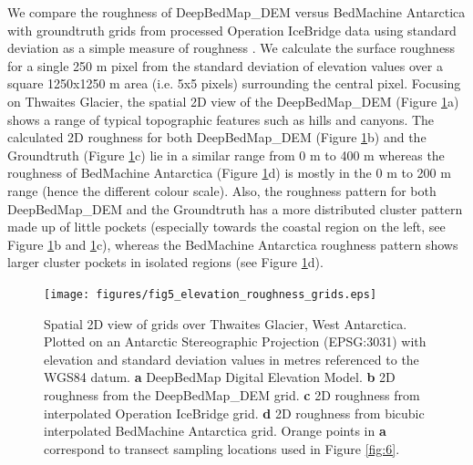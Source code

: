 \documentclass[tc, manuscript]{copernicus}
\begin{document}
We compare the roughness of DeepBedMap\_DEM versus BedMachine Antarctica with groundtruth grids from processed Operation IceBridge data \citep{ShiMultichannelCoherentRadar2010} using standard deviation as a simple measure of roughness \citep{RippinBasalroughnessInstitute2014}.
We calculate the surface roughness for a single 250 m pixel from the standard deviation of elevation values over a square 1250x1250 m area (i.e. 5x5 pixels) surrounding the central pixel.
Focusing on Thwaites Glacier, the spatial 2D view of the DeepBedMap\_DEM (Figure \ref{fig:5}a) shows a range of typical topographic features such as hills and canyons.
The calculated 2D roughness for both DeepBedMap\_DEM (Figure \ref{fig:5}b) and the Groundtruth (Figure \ref{fig:5}c) lie in a similar range from 0 m to 400 m whereas the roughness of BedMachine Antarctica (Figure \ref{fig:5}d) is mostly in the 0 m to 200 m range (hence the different colour scale).
Also, the roughness pattern for both DeepBedMap\_DEM and the Groundtruth has a more distributed cluster pattern made up of little pockets (especially towards the coastal region on the left, see Figure \ref{fig:5}b and \ref{fig:5}c), whereas the BedMachine Antarctica roughness pattern shows larger cluster pockets in isolated regions (see Figure \ref{fig:5}d).

\begin{figure}[htbp]
  \texttt{[image: figures/fig5\_elevation\_roughness\_grids.eps]}
  \caption{
    Spatial 2D view of grids over Thwaites Glacier, West Antarctica.
    Plotted on an Antarctic Stereographic Projection (EPSG:3031) with elevation and standard deviation values in metres referenced to the WGS84 datum.
    \textbf{a} DeepBedMap Digital Elevation Model.
    \textbf{b} 2D roughness from the DeepBedMap\_DEM grid.
    \textbf{c} 2D roughness from interpolated Operation IceBridge grid.
    \textbf{d} 2D roughness from bicubic interpolated BedMachine Antarctica grid.
    Orange points in \textbf{a} correspond to transect sampling locations used in Figure \ref{fig:6}.
  }
  \label{fig:5}
\end{figure}
\end{document}
